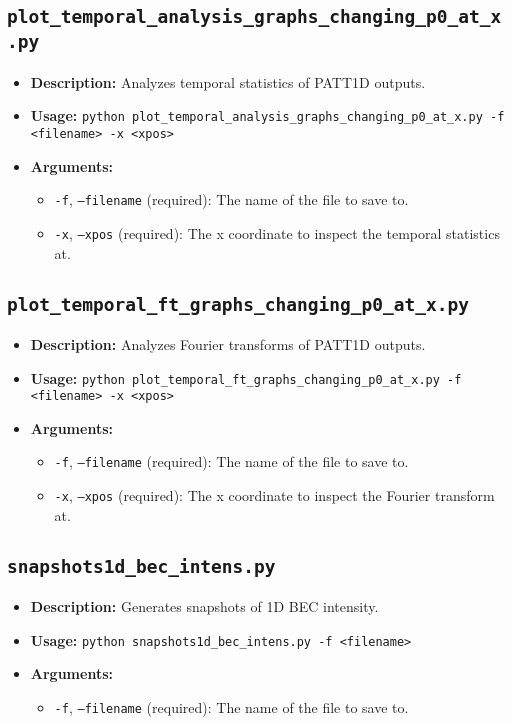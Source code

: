 \documentclass{article}
\begin{document}
\subsection{\texttt{plot\_temporal\_analysis\_graphs\_changing\_p0\_at\_x.py}}
\begin{itemize}
    \item \textbf{Description:} Analyzes temporal statistics of PATT1D outputs.
    \item \textbf{Usage:} \texttt{python plot\_temporal\_analysis\_graphs\_changing\_p0\_at\_x.py -f <filename> -x <xpos>}
    \item \textbf{Arguments:}
    \begin{itemize}
        \item \texttt{-f}, \texttt{--filename} (required): The name of the file to save to.
        \item \texttt{-x}, \texttt{--xpos} (required): The x coordinate to inspect the temporal statistics at.
    \end{itemize}
\end{itemize}

\subsection{\texttt{plot\_temporal\_ft\_graphs\_changing\_p0\_at\_x.py}}
\begin{itemize}
    \item \textbf{Description:} Analyzes Fourier transforms of PATT1D outputs.
    \item \textbf{Usage:} \texttt{python plot\_temporal\_ft\_graphs\_changing\_p0\_at\_x.py -f <filename> -x <xpos>}
    \item \textbf{Arguments:}
    \begin{itemize}
        \item \texttt{-f}, \texttt{--filename} (required): The name of the file to save to.
        \item \texttt{-x}, \texttt{--xpos} (required): The x coordinate to inspect the Fourier transform at.
    \end{itemize}
\end{itemize}

\subsection{\texttt{snapshots1d\_bec\_intens.py}}
\begin{itemize}
    \item \textbf{Description:} Generates snapshots of 1D BEC intensity.
    \item \textbf{Usage:} \texttt{python snapshots1d\_bec\_intens.py -f <filename>}
    \item \textbf{Arguments:}
    \begin{itemize}
        \item \texttt{-f}, \texttt{--filename} (required): The name of the file to save to.
    \end{itemize}
\end{itemize}
\end{document}
